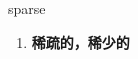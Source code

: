 
\begin{frame}
{\huge sparse}
\begin{center}
\begin{enumerate}\Large
  \item \textbf{稀疏的，稀少的}
\end{enumerate}
\end{center}
\end{frame}
